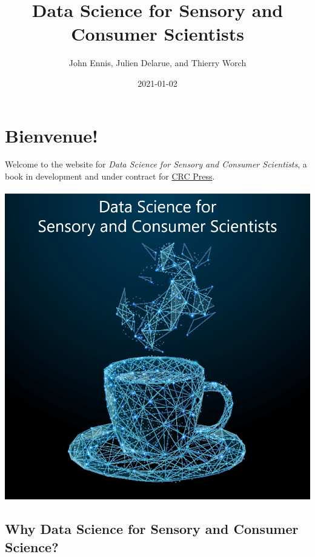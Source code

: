 \documentclass[
]{book}
\title{Data Science for Sensory and Consumer Scientists}
\author{John Ennis, Julien Delarue, and Thierry Worch}
\date{2021-01-02}
\begin{document}
\maketitle

{
\setcounter{tocdepth}{1}
\tableofcontents
}
\hypertarget{bienvenue}{%
\chapter*{Bienvenue!}\label{bienvenue}}

Welcome to the website for \emph{Data Science for Sensory and Consumer Scientists}, a book in development and under contract for \href{https://www.routledge.com/}{CRC Press}.

\begin{center}\includegraphics[width=13.44in]{images/cover_art} \end{center}

\hypertarget{why-data-science-for-sensory-and-consumer-science}{%
\section*{Why Data Science for Sensory and Consumer Science?}\label{why-data-science-for-sensory-and-consumer-science}}
\end{document}
